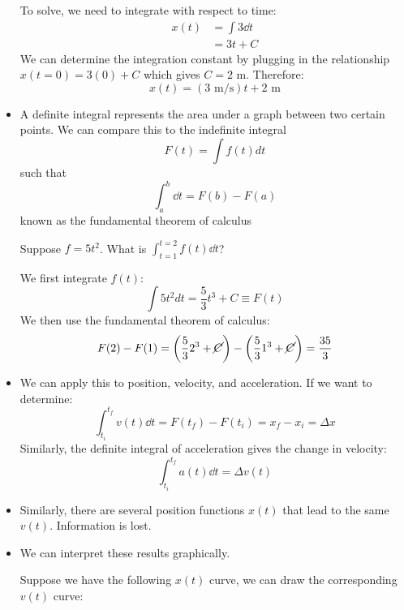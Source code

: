 \begin{itemize}
\begin{example}
        To solve, we need to integrate with respect to time:
        \begin{align}
            x(t) &= \int 3 \dd{t} \\ 
            &= 3t+C
        \end{align}
        We can determine the integration constant by plugging in the relationship $x(t=0)=3(0)+C$ which gives $C=2 \text{ m}$. Therefore:
        \begin{equation}
            x(t) = (3 \text{ m/s})t+2 \text{ m}
            \label{eq:}
        \end{equation}
    \end{example}
    \item A definite integral represents the area under a graph between two certain points. We can compare this to the indefinite integral 
    \begin{equation}
        F(t)=\int f(t) dt
        \label{eq:}
    \end{equation}
    such that
    \begin{equation}
        \int_a^b \dd{t} = F(b)-F(a)
        \label{eq:}
    \end{equation}
    known as the fundamental theorem of calculus
    \begin{example}
        Suppose $f = 5t^2$. What is $\int_{t=1}^{t=2} f(t) \dd{t}$?
        \vspace{2mm}

        We first integrate $f(t)$:
        \begin{equation}
            \int 5t^2 dt = \frac{5}{3}t^3 + C \equiv F(t)
            \label{eq:}
        \end{equation}
        We then use the fundamental theorem of calculus:
        \begin{equation}
            F(2)-F(1)=\left(\frac{5}{3}2^3+\cancel{C}\right)-\left(\frac{5}{3}1^3+\cancel{C}\right)=\frac{35}{3}
            \label{eq:}
        \end{equation}
    \end{example}
    \item We can apply this to position, velocity, and acceleration. If we want to determine:
    \begin{equation}
        \int_{t_i}^{t_f} v(t) \dd{t} = F(t_f)-F(t_i) = x_f-x_i = \Delta x
        \label{eq:}
    \end{equation}
    Similarly, the definite integral of acceleration gives the change in velocity:
    \begin{equation}
        \int_{t_i}^{t_f} a(t) \dd{t} = \Delta v(t)
        \label{eq:}
    \end{equation}
    \item Similarly, there are several position functions $x(t)$ that lead to the same $v(t)$. Information is lost.
    \item We can interpret these results graphically.
    \begin{example}
        Suppose we have the following $x(t)$ curve, we can draw the corresponding $v(t)$ curve:


\end{example}
\end{itemize}
